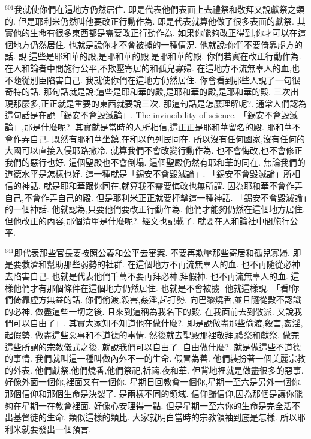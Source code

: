 \documentclass{book}
\begin{document}
$^{601}$我就使你們在這地方仍然居住.
即是代表他們表面上去禮祭和敬拜又說獻祭之類的.
但是耶利米仍然叫他要改正行動作為.
即是代表就算他做了很多表面的獻祭.
其實他的生命有很多東西都是需要改正行動作為.
如果你能夠改正得到,你才可以在這個地方仍然居住.
也就是說你才不會被擄的一種情況.
他就說:你們不要倚靠虛方的話.
說:這些是耶和華的殿,是耶和華的殿,是耶和華的殿.
你們若實在改正行動作為.
在人和論者中間施行公平,不欺壓寄居的和孤兒寡婦.
在這地方不流無辜人的血,也不隨從別臣陷害自己.
我就使你們在這地方仍然居住.
你會看到那些人說了一句很奇特的話.
那句話就是說:這些是耶和華的殿,是耶和華的殿,是耶和華的殿.
三次出現那麼多,正正就是重要的東西就要說三次.
那這句話是怎麼理解呢?.
通常人們認為這句話是在說「錫安不會毀滅論」.
The invincibility of science.
「錫安不會毀滅論」,那是什麼呢?.
其實就是當時的人所相信,這正正是耶和華留名的殿.
耶和華不會作弄自己.
既然有耶和華坐鎮,在和以色列民同在.
所以沒有任何國家,沒有任何的大國可以直接入侵耶路撒冷.
就算我們不會改變行動作為.
也不會悔改,也不會修正我們的惡行也好.
這個聖殿也不會倒塌.
這個聖殿仍然有耶和華的同在.
無論我們的道德水平是怎樣也好.
這一種就是「錫安不會毀滅論」.
「錫安不會毀滅論」所相信的神話.
就是耶和華跟你同在,就算我不需要悔改也無所謂.
因為耶和華不會作弄自己,不會作弄自己的殿.
但是耶利米正正就要抨擊這一種神話.
「錫安不會毀滅論」的一個神話.
他就認為,只要他們要改正行動作為.
他們才能夠仍然在這個地方居住.
但他改正的內容,那個清單是什麼呢?.
經文也記載了.
就要在人和論社中間施行公平.

$^{641}$即代表那些官長要按照公義和公平去審案.
不要再欺壓那些寄居和孤兒寡婦.
即是要救濟和幫助那些弱勢的社群.
在這個地方不再流無辜人的血.
也不再隨從必神去陷害自己.
也就是代表他們千萬不要再拜必神,拜假神.
也不再流無辜人的血.
這樣他們才有那個條件在這個地方仍然居住.
也就是不會被擄.
他就這樣說.
「看!你們倚靠虛方無益的話.
你們偷渡,殺害,姦淫,起打勢.
向巴黎燒香,並且隨從數不認識的必神.
做盡這些一切之後.
且來到這稱為我名下的殿.
在我面前去到敬派.
又說我們可以自由了」.
其實大家知不知道他在做什麼?.
即是說做盡那些偷渡,殺害,姦淫,起假勢.
做盡這些惡事和不道德的事情.
然後就去聖殿那裡敬拜,禮祭和獻祭.
做完這些所謂的宗教儀式之後.
就說我們可以自由了.
自由做什麼?.
就是做這些不道德的事情.
我們就叫這一種叫做內外不一的生命.
假冒為善.
他們裝扮著一個美麗宗教的外表.
他們獻祭,他們燒香,他們祭祀,祈禱,夜和華.
但背地裡就是做盡很多的惡事.
好像外面一個你,裡面又有一個你.
星期日回教會一個你,星期一至六是另外一個你.
那個信仰和那個生命是決裂了.
是兩樣不同的領域.
信仰歸信仰,因為那個是讓你能夠在星期一在教會裡面.
好像心安理得一點.
但是星期一至六你的生命是完全活不出基督徒的生命.
類似這樣的類比.
大家就明白當時的宗教領袖到底是怎樣.
所以耶利米就要發出一個預言.
\end{document}
